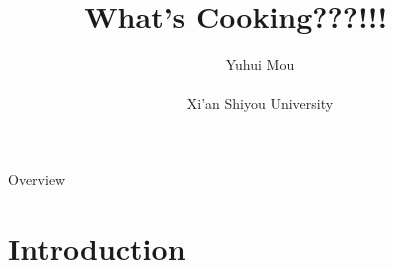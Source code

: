 \documentclass[
 size=14pt,
 paper=smartboard,  %
 mode=present, 		%
 display=slides, 	%
 style=tuliplab,  	%
 pauseslide,
 fleqn,leqno]{powerdot}
\title{What's Cooking???!!!~~~} %
\author{
Yuhui Mou
\\
\\Xi'an Shiyou University
} %
\newcommand\twotonebox[2]{\fcolorbox{pdcolor2}{pdcolor2}
{#1\vphantom{#2}}\fcolorbox{pdcolor2}{white}{#2\vphantom{#1}}}
\begin{document}
\maketitle



\begin{slide}[toc=,bm=]{Overview}  %
\tableofcontents
\end{slide}


\section{Introduction} %



\end{document}
